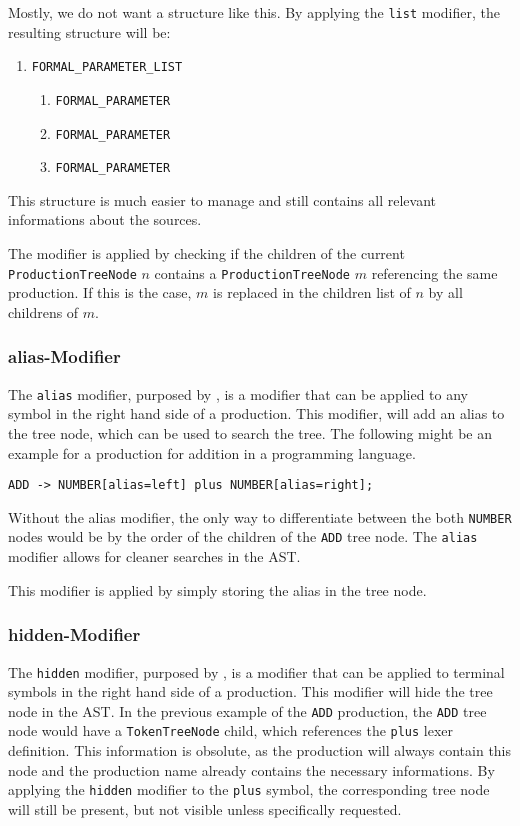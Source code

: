 Mostly, we do not want a structure like this. By applying the \verb|list| modifier, the resulting structure will be:

\begin{enumerate}
\item	\verb|FORMAL_PARAMETER_LIST|
\begin{enumerate}
\item \verb|FORMAL_PARAMETER|
\item \verb|FORMAL_PARAMETER|
\item \verb|FORMAL_PARAMETER|
\end{enumerate}
\end{enumerate}

This structure is much easier to manage and still contains all relevant informations about the sources.

The modifier is applied by checking if the children of the current \verb|ProductionTreeNode| $n$ contains a \verb|ProductionTreeNode| $m$ referencing the same production. If this is the case, $m$ is replaced in the children list of $n$ by all childrens of $m$.

\subsubsection{alias-Modifier}

The \verb|alias| modifier, purposed by \cite{GeneratingRewritableAST}, is a modifier that can be applied to any symbol in the right hand side of a production. This modifier, will add an alias to the tree node, which can be used to search the tree. The following might be an example for a production for addition in a programming language.

\begin{verbatim}
ADD -> NUMBER[alias=left] plus NUMBER[alias=right];
\end{verbatim}

Without the alias modifier, the only way to differentiate between the both \verb|NUMBER| nodes would be by the order of the children of the \verb|ADD| tree node. The \verb|alias| modifier allows for cleaner searches in the AST.

This modifier is applied by simply storing the alias in the tree node.


\subsubsection{hidden-Modifier}

The \verb|hidden| modifier, purposed by \cite{GeneratingRewritableAST}, is a modifier that can be applied to terminal symbols in the right hand side of a production. This modifier will hide the tree node in the AST. In the previous example of the \verb|ADD| production, the \verb|ADD| tree node would have a \verb|TokenTreeNode| child, which references the \verb|plus| lexer definition. This information is obsolute, as the production will always contain this node and the production name already contains the necessary informations. By applying the \verb|hidden| modifier to the \verb|plus| symbol, the corresponding tree node will still be present, but not visible unless specifically requested.

